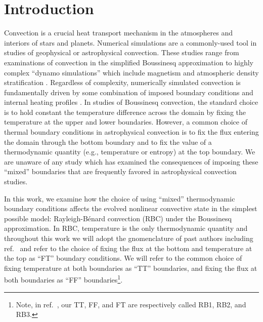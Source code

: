\documentclass[aps, pre, onecolumn, nofootinbib, notitlepage, groupedaddress, amsfonts, amssymb, amsmath, longbibliography, superscriptaddress]{revtex4-1}
\newcommand{\RB}{Rayleigh-B\'{e}nard }
\newcommand{\ea}[1]{{\color{red} #1}}
\begin{document}

\section{Introduction}
\label{sec:introduction}
Convection is a crucial heat transport mechanism in the atmospheres and interiors of stars and planets.
Numerical simulations are a commonly-used tool in studies of geophysical or astrophysical convection.
These studies range from examinations of convection in the simplified Boussinesq approximation \cite{spiegel&veronis1960, ahlers&all2009, plumley&julien2019} to highly complex ``dynamo simulations'' which include magnetism and atmospheric density stratification \cite{charbonneau2014, toomre2019}.
Regardless of complexity, numerically simulated convection is fundamentally driven by some combination of imposed boundary conditions and internal heating profiles \cite{goluskin2016}.
In studies of Boussinesq convection, the standard choice is to hold constant the temperature difference across the domain by fixing the temperature at the upper and lower boundaries.
However, a common choice of thermal boundary conditions in astrophysical convection \cite{glatzmaier&gilman1982, hurlburt&all1986, cattaneo&all1990, featherstone&hindman2016a, korre&all2019, wood&brummell2018, kapyla&all2019} is to fix the flux entering the domain through the bottom boundary and to fix the value of a thermodynamic quantity (e.g., temperature or entropy) at the top boundary.
We are unaware of any study which has examined the consequences of imposing these ``mixed'' boundaries that are frequently favored in astrophysical convection studies.

In this work, we examine how the choice of using ``mixed'' \ea{thermodynamic boundary conditions} affects the evolved nonlinear convective state in the simplest possible model: \RB convection (RBC) under the Boussinesq approximation.
In RBC, temperature is the only thermodynamic quantity and throughout this work we will \ea{adopt the gnomenclature of past authors including ref.~\cite{ishiwatari&all1994} and} refer to the choice of fixing the flux at the bottom and temperature at the top as ``FT'' boundary conditions.
We will refer to the common choice of fixing temperature at both boundaries as ``TT'' boundaries, and fixing the flux at both boundaries as ``FF'' boundaries\footnote{Note, in ref.~\cite{goluskin2016}, our TT, FF, and FT are respectively called RB1, RB2, and RB3.}.
\end{document}
